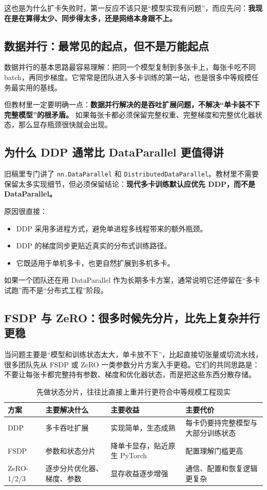 这也是为什么扩卡失败时，第一反应不该只是“模型实现有问题”，而应先问：\textbf{我现在是在算得太少、同步得太多，还是网络本身跟不上。}

\subsection{数据并行：最常见的起点，但不是万能起点}
数据并行的基本思路最容易理解：把同一个模型复制到多张卡上，每张卡吃不同 batch，再同步梯度。它常常是团队进入多卡训练的第一站，也是很多中等规模任务最实用的基线。

但教材里一定要明确一点：\textbf{数据并行解决的是吞吐扩展问题，不解决“单卡装不下完整模型”的根矛盾。} 如果每张卡都必须保留完整权重、完整梯度和完整优化器状态，那么显存瓶颈很快就会出现。

\subsection{为什么 DDP 通常比 DataParallel 更值得讲}
旧稿里专门讲了 \texttt{nn.DataParallel} 和 \texttt{DistributedDataParallel}。教材里不需要保留太多实现细节，但必须保留结论：\textbf{现代多卡训练默认应优先 DDP，而不是 DataParallel。}

原因很直接：
\begin{itemize}
  \item DDP 采用多进程方式，避免单进程多线程带来的额外瓶颈。
  \item DDP 的梯度同步更贴近真实的分布式训练路径。
  \item 它既适用于单机多卡，也更自然扩展到多机多卡。
\end{itemize}

如果一个团队还在用 DataParallel 作为长期多卡方案，通常说明它还停留在“多卡试跑”而不是“分布式工程”阶段。

\subsection{FSDP 与 ZeRO：很多时候先分片，比先上复杂并行更稳}
当问题主要是“模型和训练状态太大，单卡放不下”，比起直接切张量或切流水线，很多团队先从 FSDP 或 ZeRO 一类参数分片方案入手更稳。它们的共同思路是：不要让每张卡都完整持有参数、梯度和优化器状态，而是把这些东西分散存储。

\begin{table}[H]
\centering
\small
\begin{tabularx}{\textwidth}{>{\raggedright\arraybackslash}p{2.5cm}>{\raggedright\arraybackslash}p{3.2cm}>{\raggedright\arraybackslash}p{2.6cm}>{\raggedright\arraybackslash}X}
\toprule
\textbf{方案} & \textbf{主要解决什么} & \textbf{主要收益} & \textbf{主要代价} \\
\midrule
DDP & 多卡吞吐扩展 & 实现简单，生态成熟 & 每卡仍要持完整模型与大部分训练状态 \\
FSDP & 参数和状态分片 & 降单卡显存，贴近原生 PyTorch & 配置理解门槛更高 \\
ZeRO-1/2/3 & 逐步分片优化器、梯度、参数 & 显存收益逐步增强 & 通信、配置和恢复逻辑更复杂 \\
\bottomrule
\end{tabularx}
\caption{先做状态分片，往往比直接上重并行更符合中等规模工程现实}
\label{tab:ddp-fsdp-zero}
\end{table}

